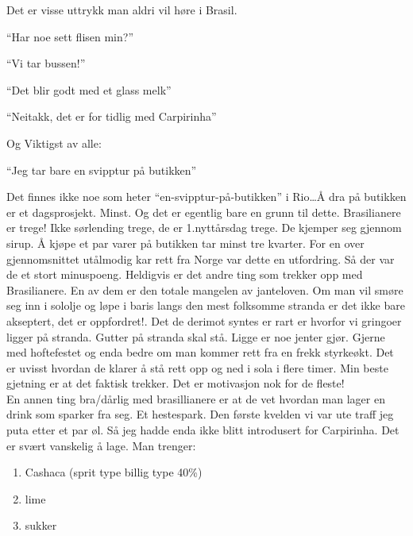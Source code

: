 Det er visse uttrykk man aldri vil høre i Brasil.
\begin{dialogue}
	\item ``Har noe sett flisen min?''\\
	\item ``Vi tar bussen!''\\
	\item ``Det blir godt med et glass melk''\\
	\item ``Neitakk, det er for tidlig med Carpirinha''\\	
\end{dialogue}
Og Viktigst av alle:\\
\begin{dialogue}
	\item ``Jeg tar bare en svipptur på butikken''
\end{dialogue}
Det finnes ikke noe som heter ``en-svipptur-på-butikken'' i Rio\ldots Å dra på butikken er
et dagsprosjekt. Minst.  Og det er egentlig bare en grunn til dette.
Brasilianere er trege! Ikke sørlending trege, de er 1.nyttårsdag
trege. De kjemper seg gjennom sirup. Å kjøpe et par varer på butikken
tar minst tre kvarter. For en over gjennomsnittet utålmodig kar rett
fra Norge var dette en utfordring. Så der var de et stort minuspoeng.
Heldigvis er det andre ting som trekker opp med Brasilianere. En av
dem er den totale mangelen av janteloven. Om man vil smøre seg inn i
sololje og løpe i baris langs den mest folksomme stranda er det ikke
bare akseptert, det er oppfordret!. Det de derimot syntes er rart er
hvorfor vi gringoer ligger på stranda. Gutter på stranda skal stå.
Ligge er noe jenter gjør. Gjerne med hoftefestet og enda bedre om man kommer rett fra en frekk styrkeøkt. Det er uvisst hvordan de klarer å stå rett opp
og ned i sola i flere timer. Min beste gjetning er at det faktisk
trekker. Det er motivasjon nok for de fleste!\\

En annen ting bra/dårlig med brasillianere er at de vet hvordan man
lager en drink som sparker fra seg. Et hestespark. Den første kvelden
vi var ute traff jeg puta etter et par øl. Så jeg hadde enda ikke
blitt introdusert for Carpirinha.
Det er svært vanskelig å lage. Man trenger:

\begin{enumerate}
	\item Cashaca (sprit type billig type 40\%)
	\item lime 
	\item sukker
\end{enumerate}

